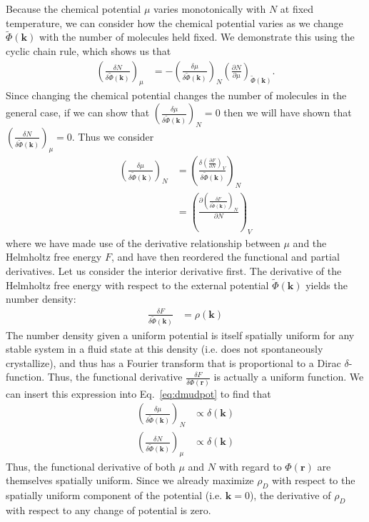 \documentclass[pre,twocolumn]{revtex4-2}
\newcommand{\rvec}{\mathbf{r}}
\newcommand{\kvec}{\mathbf{k}}
\newcommand\V{\Phi}
\newcommand\Vk{\tilde\Phi(\kvec)}
\newcommand\volume{V}
\begin{document}
Because the chemical potential $\mu$ varies monotonically with $N$ at fixed
temperature, we can consider how the chemical potential varies as we change
$\Vk$ with the number of molecules held fixed. We demonstrate this using the
cyclic chain rule, which shows us that
\begin{align}
    \left(\frac{\delta N}{\delta \Vk}\right)_{\mu} &=
    -\left(\frac{\delta \mu}{\delta \Vk}\right)_{N}
    \left(\frac{\partial N}{\partial \mu}\right)_{\Vk}.
\end{align}
Since changing the chemical potential changes the number of molecules in the
general case, if we can show that $\left(\frac{\delta \mu}{\delta
\Vk}\right)_{N}=0$ then we will have shown that $\left(\frac{\delta N}{\delta
\Vk}\right)_{\mu}=0$. Thus we consider
\begin{align}
    \left(\frac{\delta \mu}{\delta \Vk}\right)_N
    &= \left(\frac{\delta \left(\frac{\partial F}{\partial N}\right)_{\volume}}{\delta \Vk}\right)_N
    \\
    &= \left(\frac{\partial \left(\frac{\delta F}{\delta \Vk}\right)_{N}}{\partial N}\right)_{\volume}
    \label{eq:dmudpot}
\end{align}
where we have made use of the derivative relationship between $\mu$ and the
Helmholtz free energy $F$, and have then reordered the functional and partial
derivatives. Let us consider the interior derivative first. The derivative of
the Helmholtz free energy with respect to the external potential $\Vk$ yields
the number density:
\begin{align}
    \frac{\delta F}{\delta \Vk} &= \rho(\kvec)
\end{align}
The number density given a uniform potential is itself spatially uniform for
any stable system in a fluid state at this density (i.e. does not spontaneously
crystallize), and thus has a Fourier transform that is proportional to a Dirac
$\delta$-function. Thus, the functional derivative $\frac{\delta F}{\delta
\V(\rvec)}$ is actually a uniform function. We can insert this expression into
Eq.~\ref{eq:dmudpot} to find that
\begin{align}
    \left(\frac{\delta \mu}{\delta \Vk}\right)_N &\propto \delta(\kvec) \\
    \left(\frac{\delta N}{\delta \Vk}\right)_\mu &\propto \delta(\kvec)
\end{align}
Thus, the functional derivative of both $\mu$ and $N$ with regard to
$\V(\rvec)$ are themselves spatially uniform. Since we already maximize
$\rho_D$ with respect to the spatially uniform component of the potential (i.e.
$\kvec=0$), the derivative of $\rho_D$ with respect to any change of potential
is zero.
\end{document}
